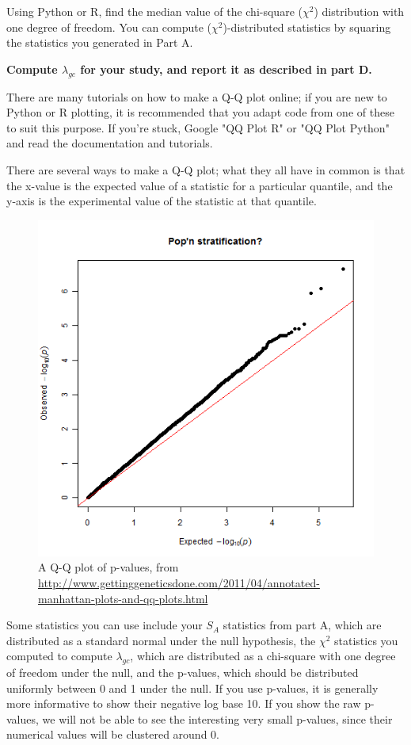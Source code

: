 \documentclass{article}
\begin{document}
Using Python or R, find the median value of the chi-square ($\chi^2$) distribution 
with one degree of freedom.  You can compute ($\chi^2$)-distributed statistics
by squaring the statistics you generated in Part A.

\textbf{Compute $\lambda_{gc}$ for your study, and report it as described in part D.}

There are many tutorials on how to make a Q-Q plot online;
if you are new to Python or R plotting, it is recommended that you adapt
code from one of these to suit this purpose.  If you're stuck,
Google "QQ Plot R" or "QQ Plot Python" and read the documentation and tutorials.

There are several ways to make a Q-Q plot; what they all have in common
is that the x-value is the expected value of a statistic for a particular quantile,
and the y-axis is the experimental value of the statistic at that quantile.
\begin{figure}[ht]
\begin{center}
\includegraphics[scale=.4]{qq_example.png}
\end{center}
\caption{A Q-Q plot of p-values, from \url{http://www.gettinggeneticsdone.com/2011/04/annotated-manhattan-plots-and-qq-plots.html}}
\end{figure}

Some statistics you can use include your $S_A$ statistics from part A, which
are distributed as a standard normal under the null hypothesis, the $\chi^2$ statistics
you computed to compute $\lambda_{gc}$, which are distributed as a 
chi-square with one degree of freedom under the null, and the p-values, which
should be distributed uniformly between 0 and 1 under the null. If you use p-values,
it is generally more informative to show their negative log base 10.
If you show the raw p-values, we will not be able to see the interesting 
very small p-values, since their numerical values will be clustered around 0.
\end{document}
